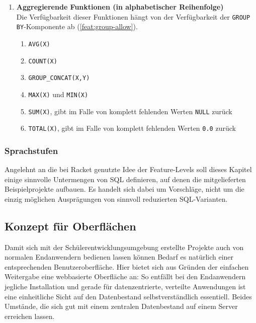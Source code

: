 \begin{enumerate}
\item \textbf{Aggregierende Funktionen (in alphabetischer Reihenfolge)} \\
  Die Verfügbarkeit dieser Funktionen hängt von der Verfügbarkeit der \texttt{GROUP BY}-Komponente ab (\ref{feat:group-allow}).
  \begin{enumerate}
  \item \label{feat:fun-avg} \texttt{AVG(X)}
  \item \label{feat:fun-count} \texttt{COUNT(X)}
  \item \label{feat:fun-group-concat} \texttt{GROUP\_CONCAT(X,Y)}
  \item \label{feat:fun-max-min} \texttt{MAX(X)} und \texttt{MIN(X)}
  \item \label{feat:fun-sum} \texttt{SUM(X)}, gibt im Falle von komplett fehlenden Werten \texttt{NULL} zurück
  \item \label{feat:fun-total} \texttt{TOTAL(X)}, gibt im Falle von komplett fehlenden Werten \texttt{0.0} zurück
  \end{enumerate}
\end{enumerate}

\subsubsection{Sprachstufen}
\label{sec:sql-subset-ranks}

Angelehnt an die bei Racket genutzte Idee der Feature-Levels soll dieses Kapitel einige sinnvolle Untermengen von SQL definieren, auf denen die mitgelieferten Beispielprojekte aufbauen. Es handelt sich dabei um Vorschläge, nicht um die einzig möglichen Ausprägungen von sinnvoll reduzierten SQL-Varianten.


\subsection{Konzept für Oberflächen}
\label{sec:design-ui-editor}

Damit sich mit der Schülerentwicklungsumgebung erstellte Projekte auch von normalen Endanwendern bedienen lassen können Bedarf es natürlich einer entsprechenden Benutzeroberfläche. Hier bietet sich aus Gründen der einfachen Weitergabe eine webbasierte Oberfläche an: So entfällt bei den Endanwendern jegliche Installation und gerade für datenzentrierte, verteilte Anwendungen ist eine einheitliche Sicht auf den Datenbestand selbstverständlich essentiell. Beides Umstände, die sich gut mit einem zentralen Datenbestand auf einem Server erreichen lassen.

